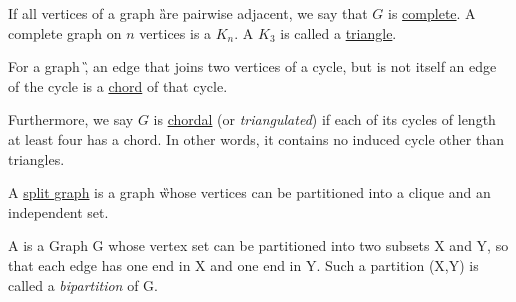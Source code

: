 \begin{graphclass}[Complete]
If all vertices of a graph \G are pairwise adjacent, we say that $G$ is \underline{complete}. 
A complete graph on $n$ vertices is a $K_n$. A $K_3$ is called a \underline{triangle}.
\end{graphclass}



\begin{graphclass}[Chordal]
For a graph \G, an edge that joins two vertices of a cycle, but is not itself an edge of the cycle is a \underline{chord} of that cycle.

Furthermore, we say $G$ is \underline{chordal} (or \textit{triangulated}) if each of its cycles of length at least four has a chord. In other words, it contains no induced cycle other than triangles.

\end{graphclass}

\begin{graphclass}[Split]
A \underline{split graph} is a graph \G whose vertices can be partitioned into a clique and an independent set.    
\end{graphclass}

\begin{graphclass}
    
A \textit{\bg} is a Graph G whose vertex set can be partitioned into two subsets X and Y, so that each edge has one end in X and one end in Y. Such a partition (X,Y) is called a \textit{bipartition} of G.
\end{graphclass}

    

